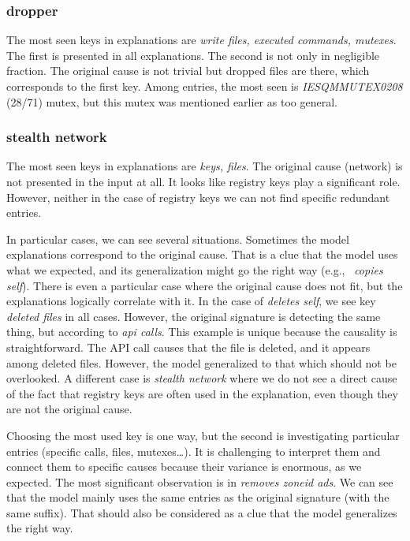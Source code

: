 \subsubsection*{dropper}
The most seen keys in explanations are \emph{write files, executed commands, mutexes}. The first is presented in all explanations. The second is not only in negligible fraction. The original cause is not trivial but dropped files are there, which corresponds to the first key. Among entries, the most seen is \emph{IESQMMUTEX0208} (28/71) mutex, but this mutex was mentioned earlier as too general.

\subsubsection*{stealth network}
The most seen keys in explanations are \emph{keys, files}. The original cause (network) is not presented in the input at all. It looks like registry keys play a significant role. However, neither in the case of registry keys we can not find specific redundant entries.

\hfill \break
In particular cases, we can see several situations. Sometimes the model explanations correspond to the original cause. That is a clue that the model uses what we expected, and its generalization might go the right way (e.g., \ \emph{copies self}). There is even a particular case where the original cause does not fit, but the explanations logically correlate with it. In the case of \emph{deletes self}, we see key \emph{deleted files} in all cases. However, the original signature is detecting the same thing, but according to \emph{api calls}. This example is unique because the causality is straightforward. The API call causes that the file is deleted, and it appears among deleted files. However, the model generalized to that which should not be overlooked. A different case is \emph{stealth network} where we do not see a direct cause of the fact that registry keys are often used in the explanation, even though they are not the original cause.

Choosing the most used key is one way, but the second is investigating particular entries (specific calls, files, mutexes\dots). It is challenging to interpret them and connect them to specific causes because their variance is enormous, as we expected. The most significant observation is in \emph{removes zoneid ads}. We can see that the model mainly uses the same entries as the original signature (with the same suffix). That should also be considered as a clue that the model generalizes the right way.

